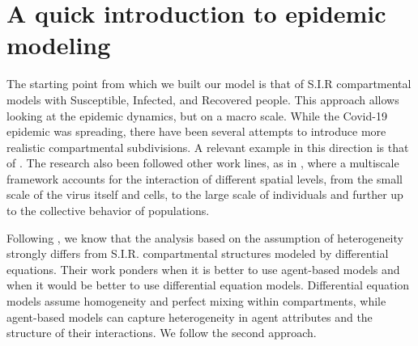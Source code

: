 \documentclass[graybox]{svmult}
\begin{document}

\section{A quick introduction to epidemic modeling}
\label{intro}

The starting point from which we built our model is that of S.I.R compartmental models with Susceptible, Infected, and Recovered people. This approach allows looking at the epidemic dynamics, but on a macro scale. While the Covid-19 epidemic was spreading, there have been several attempts to introduce more realistic compartmental subdivisions. A relevant example in this direction is that of \cite{Scala:2020aa}. The research also been followed other work lines, as in \cite{doi:10.1142/S0218202520500323}, where a multiscale framework accounts for the interaction of different spatial levels, from the small scale of the virus itself and cells, to the large scale of individuals and further up to the collective behavior of populations.

Following \cite{rahmandad2008heterogeneity}, we know that the analysis based on the assumption of  heterogeneity strongly differs from S.I.R. compartmental structures modeled by differential equations. Their work ponders when it is better to use agent-based models and when it would be better to use differential equation models. Differential equation models assume homogeneity and perfect mixing within compartments, while agent-based models can capture heterogeneity in agent attributes and the structure of their interactions. We follow the second approach.
\end{document}
